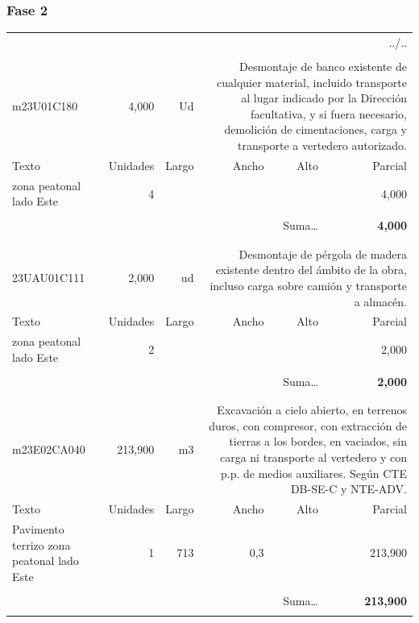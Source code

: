 \documentclass{book}%
\begin{document}
%
\subsubsection{Fase 2}%
\begin{longtable}{lrrrrr}%
\multicolumn{6}{r}{../..}\\%
\endfoot%
\endlastfoot%
&&&&&\\%
m23U01C180&     4,000& Ud&\multicolumn{3}{p{6cm}}{\scriptsize Desmontaje de banco existente de cualquier material, incluido transporte al lugar indicado por la Dirección facultativa, y si fuera necesario, demolición de cimentaciones, carga y transporte a vertedero autorizado.\normalsize}\\%
Texto&Unidades&Largo&Ancho&Alto&Parcial\\%
\hline%
\multicolumn{1}{p{3.5cm}}{ zona peatonal lado Este}&4&&&&     4,000\\%
&&&&&\\%
\multicolumn{5}{r}{Suma\ldots}&\textbf{     4,000}\\%
\hline%
&&&&&\\%
&&&&&\\%
23UAU01C111&     2,000& ud&\multicolumn{3}{p{6cm}}{\scriptsize Desmontaje de pérgola de madera existente dentro del ámbito de la obra, incluso carga sobre camión y transporte a almacén.\normalsize}\\%
Texto&Unidades&Largo&Ancho&Alto&Parcial\\%
\hline%
\multicolumn{1}{p{3.5cm}}{ zona peatonal lado Este}&2&&&&     2,000\\%
&&&&&\\%
\multicolumn{5}{r}{Suma\ldots}&\textbf{     2,000}\\%
\hline%
&&&&&\\%
&&&&&\\%
m23E02CA040&   213,900& m3&\multicolumn{3}{p{6cm}}{\scriptsize Excavación a cielo abierto, en terrenos duros, con compresor, con extracción de tierras a los bordes, en vaciados, sin carga ni transporte al vertedero y con p.p. de medios auxiliares. Según CTE DB-SE-C y NTE-ADV.\normalsize}\\%
Texto&Unidades&Largo&Ancho&Alto&Parcial\\%
\hline%
\multicolumn{1}{p{3.5cm}}{Pavimento terrizo zona peatonal lado Este}&1&713&0,3&&   213,900\\%
&&&&&\\%
\multicolumn{5}{r}{Suma\ldots}&\textbf{   213,900}\\%
\hline%
&&&&&\\%

\end{longtable}
\end{document}
